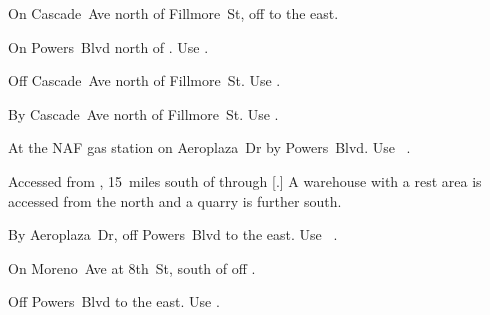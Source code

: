 
\begin{LocationList}

On Cascade~Ave north of Fillmore~St, off   to the east.

On  Powers~Blvd north of .
Use  .

\Location{\GarageHQ \Garage}
Off Cascade~Ave north of Fillmore~St.
Use  .

By Cascade~Ave north of Fillmore~St.
Use  .

At the NAF gas station on Aeroplaza~Dr by  Powers~Blvd.
Use~ .

Accessed from , 15~miles south of  through [.]
A warehouse with a rest area is accessed from the north and a quarry is further south.

By Aeroplaza~Dr, off  Powers~Blvd to the east.
Use~ .


On Moreno~Ave at 8th~St, south of  off  .


Off  Powers~Blvd to the east.
Use  .


\end{LocationList}
